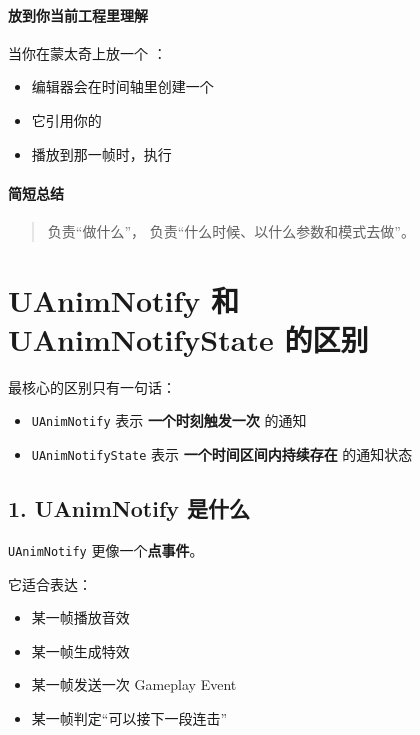 \paragraph{放到你当前工程里理解}

当你在蒙太奇上放一个 ：

\begin{itemize}
	\item 编辑器会在时间轴里创建一个 
	\item 它引用你的 
	\item 播放到那一帧时，执行 
\end{itemize}

\paragraph{简短总结}

\begin{quote}
	 负责“做什么”， 负责“什么时候、以什么参数和模式去做”。
\end{quote}

\section{UAnimNotify 和 UAnimNotifyState 的区别}

最核心的区别只有一句话：

\begin{itemize}
	\item \verb|UAnimNotify| 表示 \textbf{一个时刻触发一次} 的通知
	\item \verb|UAnimNotifyState| 表示 \textbf{一个时间区间内持续存在} 的通知状态
\end{itemize}

\subsection{1. UAnimNotify 是什么}

\verb|UAnimNotify| 更像一个\textbf{点事件}。

它适合表达：

\begin{itemize}
	\item 某一帧播放音效
	\item 某一帧生成特效
	\item 某一帧发送一次 Gameplay Event
	\item 某一帧判定“可以接下一段连击”
\end{itemize}

